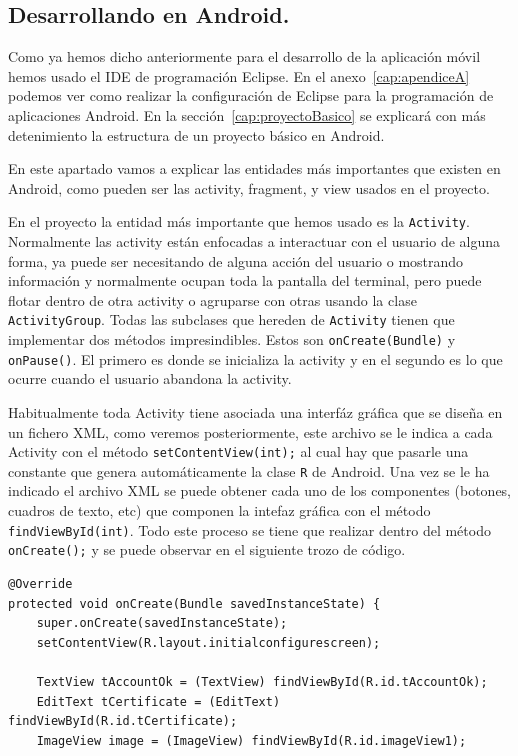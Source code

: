 \begin{itemize}
\subsection{Desarrollando en Android.}\label{cap:desarrolandoAndroid}

Como ya hemos dicho anteriormente para el desarrollo de la aplicación móvil hemos usado el IDE de programación Eclipse. En el anexo~\ref{cap:apendiceA} podemos ver como realizar la configuración de Eclipse para la programación de aplicaciones Android. En la sección~\ref{cap:proyectoBasico} se explicará con más detenimiento la estructura de un proyecto básico en Android.

En este apartado vamos a explicar las entidades más importantes que existen en Android, como pueden ser las activity, fragment, y view usados en el proyecto.

En el proyecto la entidad más importante que hemos usado es la \lstinline{Activity}. Normalmente las activity están enfocadas a interactuar con el usuario de alguna forma, ya puede ser necesitando de alguna acción del usuario o mostrando información y normalmente ocupan toda la pantalla del terminal, pero puede flotar dentro de otra activity o agruparse con otras usando la clase \lstinline{ActivityGroup}. Todas las subclases que hereden de \lstinline{Activity} tienen que implementar dos métodos impresindibles. Estos son \lstinline{onCreate(Bundle)} y \lstinline{onPause()}. El primero es donde se inicializa la activity y en el segundo es lo que ocurre cuando el usuario abandona la activity.

Habitualmente toda Activity tiene asociada una interfáz gráfica que se diseña en un fichero XML, como veremos posteriormente, este archivo se le indica a cada Activity con el método \lstinline{setContentView(int);} al cual hay que pasarle una constante que genera automáticamente la clase \lstinline{R} de Android. Una vez se le ha indicado el archivo XML se puede obtener cada uno de los componentes (botones, cuadros de texto, etc) que componen la intefaz gráfica con el método \lstinline{findViewById(int)}. Todo este proceso se tiene que realizar dentro del método \lstinline{onCreate();} y se puede observar en el siguiente trozo de código.

\begin{lstlisting}[style=Java]
@Override
protected void onCreate(Bundle savedInstanceState) {
	super.onCreate(savedInstanceState);
	setContentView(R.layout.initialconfigurescreen);

	TextView tAccountOk = (TextView) findViewById(R.id.tAccountOk);
	EditText tCertificate = (EditText) findViewById(R.id.tCertificate);
	ImageView image = (ImageView) findViewById(R.id.imageView1);


\end{lstlisting}
\end{itemize}
